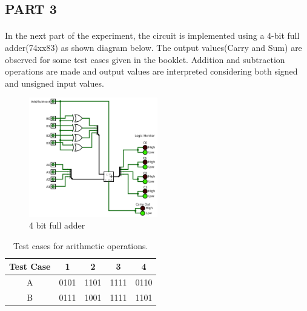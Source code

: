 \documentclass[pdftex,12pt,a4paper]{article}
\begin{document}
\begin{flushleft}
\newpage

\subsection{PART 3}
\paragraph{}
In the next part of the experiment, the circuit is implemented using a 4-bit full adder(74xx83) as shown diagram below. The output values(Carry and Sum) are observed for some test cases given in the booklet. Addition and subtraction operations are made and output values are interpreted considering both signed and unsigned input values. 

 \begin{figure}[h]
    	\centering
    	\includegraphics[width=0.5\textwidth]{part3.png}	
    	\caption{4 bit full adder}
    	\label{fig:4-bit_full_adder}
    \end{figure}


\begin{table}[h]
\begin{center}
    \begin{tabular}{|c|c|c|c|c|}
    \hline
         Test Case & 1 & 2 & 3 & 4  \\
         \hline
         A & 0101 & 1101 & 1111 & 0110 \\
         \hline
         B & 0111 & 1001 & 1111 & 1101 \\
         \hline
    \end{tabular}
    \caption{Test cases for arithmetic operations.}
    \label{truthtablep1}
\end{center}
\end{table}


\end{flushleft}
\end{document}
